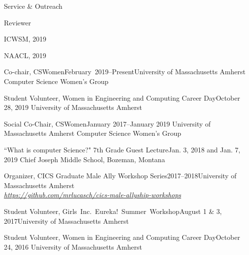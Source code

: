 \documentclass{resume} %
\begin{document}

\begin{rSection}{Service \& Outreach}

\begin{rSubsection}{Reviewer}{}{}{}
\item ICWSM, 2019
\item NAACL, 2019
\end{rSubsection}

\begin{rrSubsection}
{Co-chair, CSWomen}{February~2019--Present}{University of Massachusetts Amherst Computer Science Women's Group}{}
\end{rrSubsection}

\begin{rrSubsection}{Student Volunteer, Women in Engineering and Computing Career Day}{October 28, 2019}
{University of Massachusetts Amherst}{}
\end{rrSubsection}

\begin{rrSubsection}{Social Co-Chair,  CSWomen}{January 2017--January 2019}
{University of Massachusetts Amherst Computer Science Women's Group}{}
\end{rrSubsection}

\begin{rrSubsection}{``What is computer Science?" 7th Grade Guest Lecture}{Jan. 3, 2018 and Jan. 7, 2019}
{Chief Joseph Middle School, Bozeman, Montana}{}
\end{rrSubsection}

\begin{rrSubsection}{Organizer, CICS Graduate Male Ally Workshop Series}{2017--2018}{University of Massachusetts Amherst \\}
{\emph{\url{https://github.com/mrlucasch/cics-male-allyship-workshops}}}
\end{rrSubsection}

\begin{rrSubsection}{Student Volunteer, Girls~Inc.~Eureka!~Summer~Workshop}{August 1 \& 3, 2017}{University of Massachusetts Amherst}{}
\end{rrSubsection}


\begin{rrSubsection}{Student Volunteer, Women in Engineering and Computing Career Day}{October 24, 2016}
{University of Massachusetts Amherst}{}
\end{rrSubsection}

\end{rSection}
\end{document}

